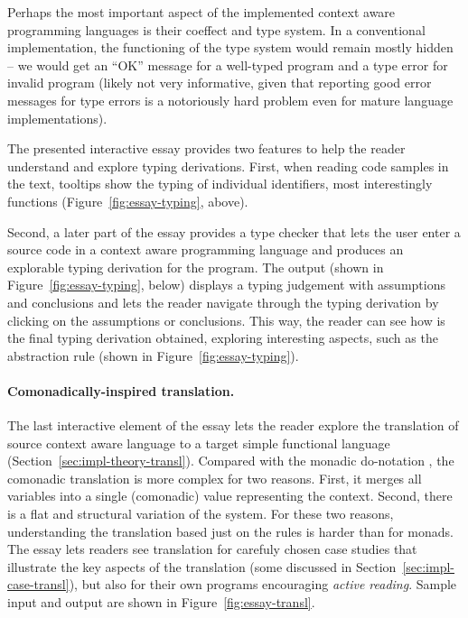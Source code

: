 Perhaps the most important aspect of the implemented context aware programming languages is their
coeffect and type system. In a conventional implementation, the functioning of the type system
would remain mostly hidden -- we would get an ``OK'' message for a well-typed program and a type
error for invalid program (likely not very informative, given that reporting good error messages
for type errors is a notoriously hard problem even for mature language implementations).

The presented interactive essay provides two features to help the reader understand and explore
typing derivations. First, when reading code samples in the text, tooltips show the typing of
individual identifiers, most interestingly functions (Figure~\ref{fig:essay-typing}, above).

Second, a later part of the essay provides a type checker that lets the user enter a source code
in a context aware programming language and produces an explorable typing derivation for the
program. The output (shown in Figure~\ref{fig:essay-typing}, below) displays a typing judgement
with assumptions and conclusions and lets the reader navigate through the typing derivation by
clicking on the assumptions or conclusions. This way, the reader can see how is the final typing
derivation obtained, exploring interesting aspects, such as the abstraction rule (shown in
Figure~\ref{fig:essay-typing}).

\paragraph{Comonadically-inspired translation.}

The last interactive element of the essay lets the reader explore the translation of source
context aware language to a target simple functional language (Section~\ref{sec:impl-theory-transl}).
Compared with the monadic do-notation \cite{other-haskell98}, the comonadic translation is more
complex for two reasons. First, it merges all variables into a single (comonadic) value representing
the context. Second, there is a flat and structural variation of the system. For these two reasons,
understanding the translation based just on the rules is harder than for monads. The essay lets
readers see translation for carefuly chosen case studies that illustrate the key aspects of the
translation (some discussed in Section~\ref{sec:impl-case-transl}), but also for their own
programs encouraging \emph{active reading}. Sample input and output are shown in
Figure~\ref{fig:essay-transl}.


